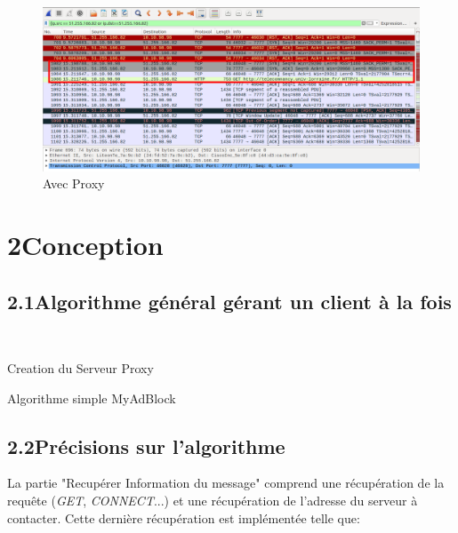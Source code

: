 \documentclass[12pt, a4paper]{report}
\begin{document}
\begin{figure}[h]
   \caption{\label{étiquette} Avec Proxy}
   \includegraphics[scale=0.38]{Images/Proxy.png}
\end{figure}




\chapter*{2\hspace{1cm}Conception}

\section*{\hspace{0.6cm}2.1\hspace{0.6cm}Algorithme général gérant un client à la fois}

\begin{algorithm}[H]
 \
 
 Creation du Serveur Proxy\;\
 
 \caption{Algorithme simple MyAdBlock}
\end{algorithm}

\newpage

\section*{\hspace{0.6cm}2.2\hspace{0.6cm}Précisions sur l'algorithme}
\hspace{1cm}La partie "Recupérer Information du message" comprend une récupération de la requête (\textit{GET}, \textit{CONNECT}...) et une récupération de l'adresse du serveur à contacter. Cette dernière récupération est implémentée telle que:\\
\end{document}
